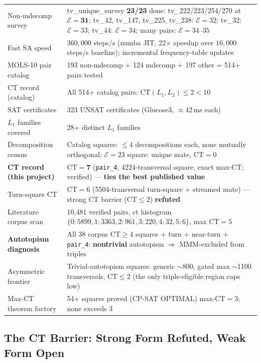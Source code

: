 \documentclass[11pt,a4paper]{article}
\theoremstyle{remark}
\newcommand{\CT}{\mathrm{CT}}
\newcommand{\E}{\mathcal{E}}
\begin{document}
\begin{table}[h]
\begin{tabular}{lp{8cm}}
Non-mdecomp survey & tv\_unique\_survey \textbf{23/23} done: tv\_222/223/254/270 at $\E=\mathbf{31}$; tv\_42, tv\_147, tv\_225, tv\_238: $\E=32$; tv\_32: $\E=33$; tv\_44: $\E=34$; many pairs: $\E=34$--$35$\\
Fast SA speed & $360{,}000$ steps/s (numba JIT, 22$\times$ speedup over $16{,}000$ steps/s baseline); incremental frequency-table updates\\
MOLS-10 pair catalog & 193 non-mdecomp + 124 mdecomp + 197 other = 514+ pairs tested\\
CT record (catalog) & All 514+ catalog pairs: $\CT(L_1,L_2) \leq 2 < 10$\\
SAT certificates & 323 UNSAT certificates (Glucose3, $\approx 42$\,ms each)\\
$L_1$ families covered & 28+ distinct $L_1$ families\\
Decomposition census & Catalog squares: $\leq 4$ decompositions each, none mutually orthogonal; $\E{=}23$ square: unique mate, $\CT=0$\\
\textbf{CT record (this project)} & $\CT = \mathbf{7}$ (\texttt{pair\_4}, 4224-transversal square, exact max-$\CT$; verified) --- \textbf{ties the best published value}~\cite{bright2022}\\
Turn-square CT & $\CT = 6$ (5504-transversal turn-square + streamed mate) --- strong CT barrier ($\CT\leq2$) \textbf{refuted}\\
Literature corpus scan & 10{,}481 verified pairs, ct histogram $\{0{:}5899,1{:}3363,2{:}961,3{:}220,4{:}32,5{:}6\}$, max $\CT=5$\\
\textbf{Autotopism diagnosis} & All 38 corpus $\CT{\geq}4$ squares + turn + near-turn + \texttt{pair\_4}: \textbf{nontrivial} autotopism $\Rightarrow$ MMM-excluded from triples\\
Asymmetric frontier & Trivial-autotopism squares: generic $\sim$800, gated max $\sim$1100 transversals, $\CT\leq2$ (the only triple-eligible region caps low)\\
Max-$\CT$ theorem factory & 54+ squares proved (CP-SAT OPTIMAL) max-$\CT=3$; none exceeds 3\\
\bottomrule
\end{tabular}
\end{table}

\subsection{The CT Barrier: Strong Form Refuted, Weak Form Open}
\end{document}

